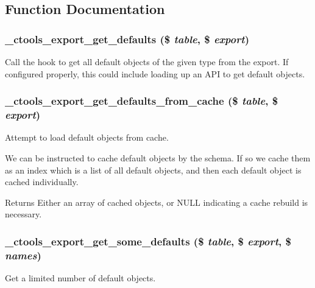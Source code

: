 \subsection{Function Documentation}
\hypertarget{export_8inc_ad9a45511f03c5f3260f3e102a804229c}{
\subsubsection[{\_\-ctools\_\-export\_\-get\_\-defaults}]{\setlength{\rightskip}{0pt plus 5cm}\_\-ctools\_\-export\_\-get\_\-defaults (\$ {\em table}, \/  \$ {\em export})}}
\label{export_8inc_ad9a45511f03c5f3260f3e102a804229c}
Call the hook to get all default objects of the given type from the export. If configured properly, this could include loading up an API to get default objects. \hypertarget{export_8inc_aab0b6bfc8bf63c6b3e521133e4bbbc5a}{
\subsubsection[{\_\-ctools\_\-export\_\-get\_\-defaults\_\-from\_\-cache}]{\setlength{\rightskip}{0pt plus 5cm}\_\-ctools\_\-export\_\-get\_\-defaults\_\-from\_\-cache (\$ {\em table}, \/  \$ {\em export})}}
\label{export_8inc_aab0b6bfc8bf63c6b3e521133e4bbbc5a}
Attempt to load default objects from cache.

We can be instructed to cache default objects by the schema. If so we cache them as an index which is a list of all default objects, and then each default object is cached individually.

\begin{DoxyReturn}{Returns}
Either an array of cached objects, or NULL indicating a cache rebuild is necessary. 
\end{DoxyReturn}
\hypertarget{export_8inc_af8d814465da6a2df308247f372cf28d6}{
\subsubsection[{\_\-ctools\_\-export\_\-get\_\-some\_\-defaults}]{\setlength{\rightskip}{0pt plus 5cm}\_\-ctools\_\-export\_\-get\_\-some\_\-defaults (\$ {\em table}, \/  \$ {\em export}, \/  \$ {\em names})}}
\label{export_8inc_af8d814465da6a2df308247f372cf28d6}
Get a limited number of default objects.

